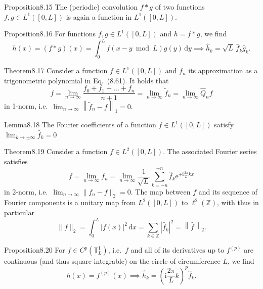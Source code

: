 \begin{res}{Proposition}{8.15}
The (periodic) convolution $f*g$ of two functions $f,g\in L^1([0,L])$ is again a function in $L^1([0,L])$.
\end{res}

\begin{res}{Proposition}{8.16}
For functions $f,g\in L^1([0,L])$ and $h=f*g$, we find
\begin{equation}h(x)=(f*g)(x)=\int_0^Lf(x-y\bmod L)g(y)\,\mathrm dy\implies\widehat h_k=\sqrt L\,\widehat f_k\widehat g_k.\tag{8.73}\end{equation}
\end{res}

\begin{res}{Theorem}{8.17}
Consider a function $f\in L^1([0,L])$ and $f_n$ its approximation as a trigonometric polynomial in Eq.~(8.61). It holds that
\begin{equation}f=\lim_{n\to\infty}\frac{f_0+f_1+\ldots+f_n}{n+1}=\lim_{n\to\infty}\tilde f_n=\lim_{n\to\infty}\hat Q_nf\tag{8.75}\end{equation}
in 1-norm, i.e.\ $\lim_{n\to\infty}\left\|\tilde f_n-f\right\|_1=0$.
\end{res}

\begin{res}{Lemma}{8.18}
The Fourier coefficients of a function $f\in L^1([0,L])$ satisfy $\lim_{k\to\pm\infty}\widehat f_k=0$
\end{res}

\begin{res}{Theorem}{8.19}
Consider a function $f\in L^2([0,L])$. The associated Fourier series satisfies
\begin{equation}f=\lim_{n\to\infty}f_n=\lim_{n\to\infty}\frac1{\sqrt L}\sum_{k=-n}^{+n}\widehat f_k\mathrm e^{+\mathrm i\frac{2\pi}{L}kx}\tag{8.76}\end{equation}
in 2-norm, i.e.\ $\lim_{n\to\infty}\|f_n-f\|_2=0$. The map between $f$ and its sequence of Fourier components is a unitary map from $L^2([0,L])$ to $\ell^2(\mathbb Z)$, with thus in particular
\begin{equation}\|f\|_2=\int_0^L|f(x)|^2\,\mathrm dx=\sum_{k\in\mathbb Z}\left|\widehat f_k\right|^2=\left\|\widehat f\right\|_2.\tag{8.77}\end{equation}
\end{res}

\begin{res}{Proposition}{8.20}
For $f\in C^p(\mathbb T^1_L)$, i.e.\ $f$ and all of its derivatives up to $f^{(p)}$ are continuous (and thus square integrable) on the circle of circumference $L$, we find
\begin{equation}h(x)=f^{(p)}(x)\implies\widehat h_k=\left(\mathrm i\frac{2\pi}{L}k\right)^p\widehat f_k.\tag{8.80}\end{equation}
\end{res}

